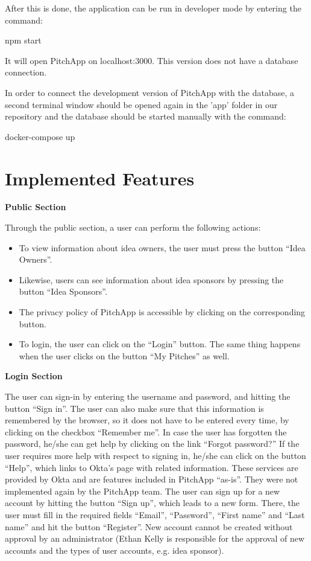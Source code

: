 After this is done, the application can be run in developer mode by entering the command:

npm start

It will open PitchApp on localhost:3000. This version does not have a database connection.

In order to connect the development version of PitchApp with the database, a second terminal window should be opened again in the 'app' folder in our repository and the database should be started manually with the command:

docker-compose up

\section{Implemented Features}

\textbf{Public Section}

Through the public section, a user can perform the following actions:

\begin{itemize}

\item To view information about idea owners, the user must press the button “Idea Owners”.
\item Likewise, users can see information about idea sponsors by pressing the button “Idea Sponsors”.
\item The privacy policy of PitchApp is accessible by clicking on the corresponding button.
\item To login, the user can click on the “Login” button. The same thing happens when the user clicks on the button “My Pitches” as well.

\end{itemize}

\textbf{Login Section}

The user can sign-in by entering the username and password, and hitting the button “Sign in”.
The user can also make sure that this information is remembered by the browser, so it does not have to be entered every time, by clicking on the checkbox “Remember me”.
In case the user has forgotten the password, he/she can get help by clicking on the link “Forgot password?”
If the user requires more help with respect to signing in, he/she can click on the button “Help”, which links to Okta’s page with related information.
These services are provided by Okta and are features included in PitchApp “as-is”. They were not implemented again by the PitchApp team.
The user can sign up for a new account by hitting the button “Sign up”, which leads to a new form. There, the user must fill in the required fields “Email”, “Password”, “First name” and “Last name” and hit the button “Register”.
New account cannot be created without approval by an administrator (Ethan Kelly is responsible for the approval of new accounts and the types of user accounts, e.g. idea sponsor).


